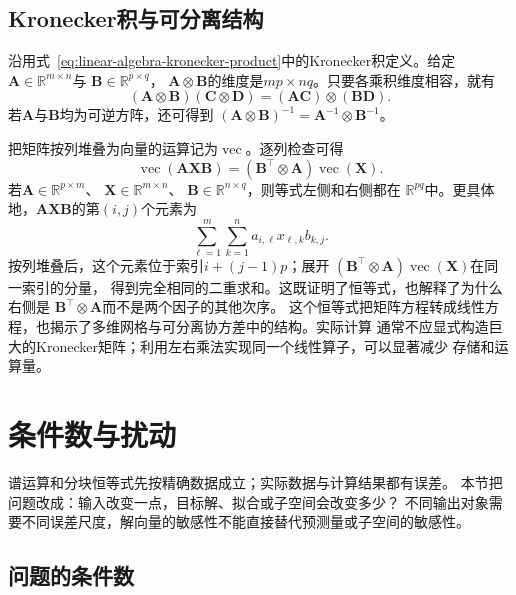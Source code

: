 \subsection{Kronecker积与可分离结构}

沿用式~\eqref{eq:linear-algebra-kronecker-product}中的Kronecker积定义。给定
$\bm{A}\in\mathbb{R}^{m\times n}$与
$\bm{B}\in\mathbb{R}^{p\times q}$，
$\bm{A}\otimes\bm{B}$的维度是$mp\times nq$。只要各乘积维度相容，就有
\begin{equation}
  (\bm{A}\otimes\bm{B})(\bm{C}\otimes\bm{D})
  =(\bm{A}\bm{C})\otimes(\bm{B}\bm{D}).
  \label{eq:matrix-analysis-kronecker-mixed-product}
\end{equation}
若$\bm{A}$与$\bm{B}$均为可逆方阵，还可得到
$(\bm{A}\otimes\bm{B})^{-1}
=\bm{A}^{-1}\otimes\bm{B}^{-1}$。

把矩阵按列堆叠为向量的运算记为$\operatorname{vec}$。逐列检查可得
\begin{equation}
  \operatorname{vec}(\bm{A}\bm{X}\bm{B})
  =(\bm{B}^{\top}\otimes\bm{A})\operatorname{vec}(\bm{X}).
  \label{eq:matrix-analysis-vec-kronecker}
\end{equation}
若$\bm{A}\in\mathbb{R}^{p\times m}$、
$\bm{X}\in\mathbb{R}^{m\times n}$、
$\bm{B}\in\mathbb{R}^{n\times q}$，则等式左侧和右侧都在
$\mathbb{R}^{pq}$中。更具体地，$\bm{A}\bm{X}\bm{B}$的第$(i,j)$个元素为
\[
  \sum_{\ell=1}^{m}\sum_{k=1}^{n}
  a_{i,\ell}x_{\ell,k}b_{k,j}.
\]
按列堆叠后，这个元素位于索引$i+(j-1)p$；展开
$(\bm{B}^{\top}\otimes\bm{A})\operatorname{vec}(\bm{X})$在同一索引的分量，
得到完全相同的二重求和。这既证明了恒等式，也解释了为什么右侧是
$\bm{B}^{\top}\otimes\bm{A}$而不是两个因子的其他次序。
这个恒等式把矩阵方程转成线性方程，也揭示了多维网格与可分离协方差中的结构。实际计算
通常不应显式构造巨大的Kronecker矩阵；利用左右乘法实现同一个线性算子，可以显著减少
存储和运算量。

\section{条件数与扰动}
\label{sec:matrix-analysis-conditioning-perturbation}

谱运算和分块恒等式先按精确数据成立；实际数据与计算结果都有误差。
本节把问题改成：输入改变一点，目标解、拟合或子空间会改变多少？
不同输出对象需要不同误差尺度，解向量的敏感性不能直接替代预测量或子空间的敏感性。

\subsection{问题的条件数}

